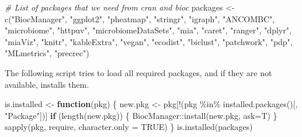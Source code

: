 \documentclass[
  oneside]{book}
\newenvironment{Shaded}{\begin{snugshade}}{\end{snugshade}}
\newcommand{\AttributeTok}[1]{\textcolor[rgb]{0.77,0.63,0.00}{#1}}
\newcommand{\CommentTok}[1]{\textcolor[rgb]{0.56,0.35,0.01}{\textit{#1}}}
\newcommand{\ConstantTok}[1]{\textcolor[rgb]{0.00,0.00,0.00}{#1}}
\newcommand{\ControlFlowTok}[1]{\textcolor[rgb]{0.13,0.29,0.53}{\textbf{#1}}}
\newcommand{\FunctionTok}[1]{\textcolor[rgb]{0.00,0.00,0.00}{#1}}
\newcommand{\NormalTok}[1]{#1}
\newcommand{\OtherTok}[1]{\textcolor[rgb]{0.56,0.35,0.01}{#1}}
\newcommand{\SpecialCharTok}[1]{\textcolor[rgb]{0.00,0.00,0.00}{#1}}
\newcommand{\StringTok}[1]{\textcolor[rgb]{0.31,0.60,0.02}{#1}}
\begin{document}
\begin{Shaded}
\begin{Highlighting}[]
\CommentTok{\# List of packages that we need from cran and bioc }
\NormalTok{packages }\OtherTok{\textless{}{-}} \FunctionTok{c}\NormalTok{(}\StringTok{"BiocManager"}\NormalTok{, }\StringTok{"ggplot2"}\NormalTok{, }\StringTok{"pheatmap"}\NormalTok{, }\StringTok{"stringr"}\NormalTok{, }\StringTok{"igraph"}\NormalTok{, }\StringTok{"ANCOMBC"}\NormalTok{,}
             \StringTok{"microbiome"}\NormalTok{, }\StringTok{"httpuv"}\NormalTok{, }\StringTok{"microbiomeDataSets"}\NormalTok{, }\StringTok{"mia"}\NormalTok{, }\StringTok{"caret"}\NormalTok{, }\StringTok{"ranger"}\NormalTok{,}
            \StringTok{"dplyr"}\NormalTok{, }\StringTok{"miaViz"}\NormalTok{, }\StringTok{"knitr"}\NormalTok{, }\StringTok{"kableExtra"}\NormalTok{, }\StringTok{"vegan"}\NormalTok{, }\StringTok{"ecodist"}\NormalTok{, }\StringTok{"biclust"}\NormalTok{,}
            \StringTok{"patchwork"}\NormalTok{, }\StringTok{"pdp"}\NormalTok{, }\StringTok{"MLmetrics"}\NormalTok{, }\StringTok{"precrec"}\NormalTok{)}
\end{Highlighting}
\end{Shaded}

The following script tries to load all required packages, and if they are not available, installs them.

\begin{Shaded}
\begin{Highlighting}[]
\NormalTok{is.installed }\OtherTok{\textless{}{-}} \ControlFlowTok{function}\NormalTok{(pkg) \{}
\NormalTok{  new.pkg }\OtherTok{\textless{}{-}}\NormalTok{ pkg[}\SpecialCharTok{!}\NormalTok{(pkg }\SpecialCharTok{\%in\%} \FunctionTok{installed.packages}\NormalTok{()[, }\StringTok{"Package"}\NormalTok{])]}
  \ControlFlowTok{if}\NormalTok{ (}\FunctionTok{length}\NormalTok{(new.pkg)) \{}
\NormalTok{    BiocManager}\SpecialCharTok{::}\FunctionTok{install}\NormalTok{(new.pkg, }\AttributeTok{ask=}\NormalTok{T)}
\NormalTok{  \}}
  \FunctionTok{sapply}\NormalTok{(pkg, require, }\AttributeTok{character.only =} \ConstantTok{TRUE}\NormalTok{)}
\NormalTok{\}}
\FunctionTok{is.installed}\NormalTok{(packages)}
\end{Highlighting}
\end{Shaded}
\end{document}
